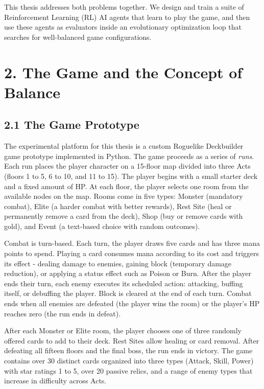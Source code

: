 This thesis addresses both problems together. We design and train a suite of Reinforcement Learning (RL) AI agents that learn to play the game, and then use these agents as evaluators inside an evolutionary optimization loop that searches for well-balanced game configurations.

\section*{2. The Game and the Concept of Balance}

\subsection*{2.1 The Game Prototype}

The experimental platform for this thesis is a custom Roguelike Deckbuilder game prototype implemented in Python. The game proceeds as a series of \textit{runs}. Each run places the player character on a 15-floor map divided into three Acts (floors 1 to 5, 6 to 10, and 11 to 15). The player begins with a small starter deck and a fixed amount of HP. At each floor, the player selects one room from the available nodes on the map. Rooms come in five types: Monster (mandatory combat), Elite (a harder combat with better rewards), Rest Site (heal or permanently remove a card from the deck), Shop (buy or remove cards with gold), and Event (a text-based choice with random outcomes).

Combat is turn-based. Each turn, the player draws five cards and has three mana points to spend. Playing a card consumes mana according to its cost and triggers its effect - dealing damage to enemies, gaining block (temporary damage reduction), or applying a status effect such as Poison or Burn. After the player ends their turn, each enemy executes its scheduled action: attacking, buffing itself, or debuffing the player. Block is cleared at the end of each turn. Combat ends when all enemies are defeated (the player wins the room) or the player's HP reaches zero (the run ends in defeat).

After each Monster or Elite room, the player chooses one of three randomly offered cards to add to their deck. Rest Sites allow healing or card removal. After defeating all fifteen floors and the final boss, the run ends in victory. The game contains over 30 distinct cards organized into three types (Attack, Skill, Power) with star ratings 1 to 5, over 20 passive relics, and a range of enemy types that increase in difficulty across Acts.


